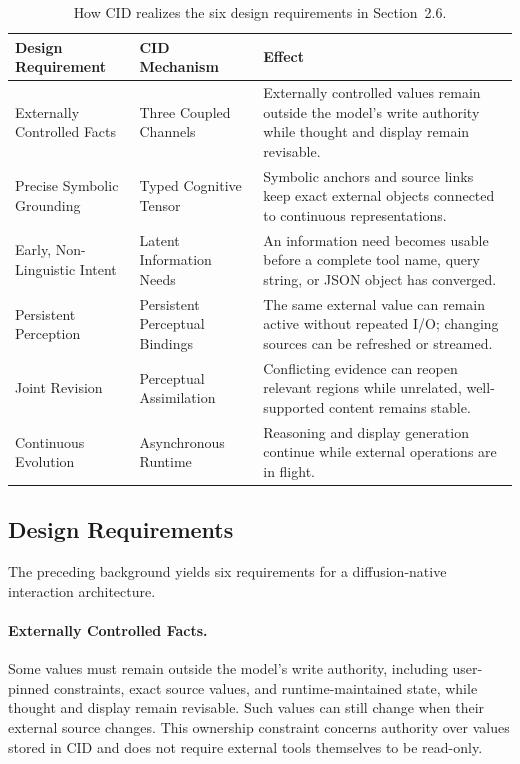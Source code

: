\begin{table}[t]
  \centering
  \footnotesize
  \renewcommand{\arraystretch}{0.92}
  \begin{tabular}{@{}>{\raggedright\arraybackslash}p{}>{\raggedright\arraybackslash}p{}>{\raggedright\arraybackslash}p{}@{}}
    \toprule
    Design Requirement & CID Mechanism & Effect \\
    \midrule
    Externally Controlled Facts & Three Coupled Channels & Externally controlled values remain outside the model's write authority while thought and display remain revisable. \\
    Precise Symbolic Grounding & Typed Cognitive Tensor & Symbolic anchors and source links keep exact external objects connected to continuous representations. \\
    Early, Non-Linguistic Intent & Latent Information Needs & An information need becomes usable before a complete tool name, query string, or JSON object has converged. \\
    Persistent Perception & Persistent Perceptual Bindings & The same external value can remain active without repeated I/O; changing sources can be refreshed or streamed. \\
    Joint Revision & Perceptual Assimilation & Conflicting evidence can reopen relevant regions while unrelated, well-supported content remains stable. \\
    Continuous Evolution & Asynchronous Runtime & Reasoning and display generation continue while external operations are in flight. \\
    \bottomrule
  \end{tabular}
  \caption{How CID realizes the six design requirements in Section~2.6.}
  \label{tab:cid-mechanisms}
\end{table}

\subsection{Design Requirements}

The preceding background yields six requirements for a diffusion-native interaction architecture.

\paragraph{Externally Controlled Facts.}
Some values must remain outside the model's write authority, including user-pinned constraints, exact source values, and runtime-maintained state, while thought and display remain revisable. Such values can still change when their external source changes. This ownership constraint concerns authority over values stored in CID and does not require external tools themselves to be read-only.

